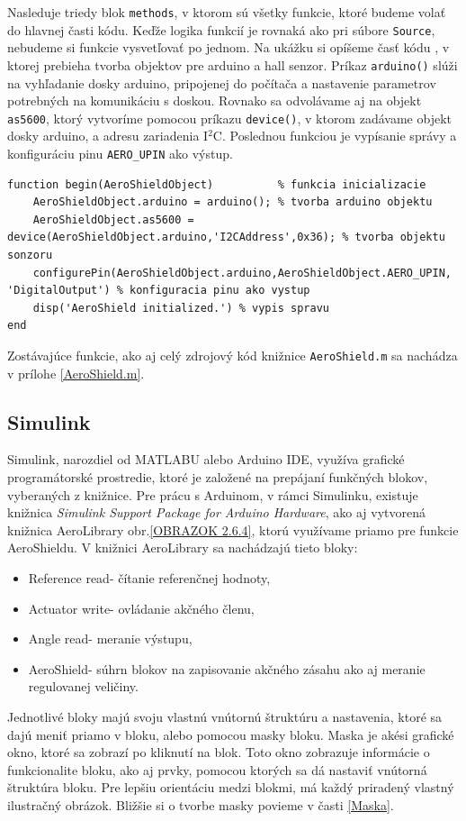 Nasleduje triedy blok \verb|methods|, v ktorom sú všetky funkcie, ktoré budeme volať do hlavnej časti kódu. Keďže logika funkcií je rovnaká ako pri súbore \verb|Source|, nebudeme si funkcie vysvetľovať po jednom. Na ukážku si opíšeme časť kódu , v ktorej prebieha tvorba objektov pre arduino a hall senzor. Príkaz \verb|arduino()| slúži na vyhľadanie dosky arduino, pripojenej do počítača a nastavenie parametrov potrebných na komunikáciu s doskou. Rovnako sa odvolávame aj na objekt \verb|as5600|, ktorý vytvoríme pomocou príkazu \verb|device()|, v ktorom zadávame objekt dosky arduino, a adresu zariadenia I$^2$C. Poslednou funkciou je vypísanie správy a konfiguráciu pinu \verb|AERO_UPIN| ako výstup. 

\begin{lstlisting}[caption={Knižnica AeroShield.m properties.},captionpos=b]
function begin(AeroShieldObject)          % funkcia inicializacie
	AeroShieldObject.arduino = arduino(); % tvorba arduino objektu
	AeroShieldObject.as5600 = device(AeroShieldObject.arduino,'I2CAddress',0x36); % tvorba objektu sonzoru
	configurePin(AeroShieldObject.arduino,AeroShieldObject.AERO_UPIN, 'DigitalOutput') % konfiguracia pinu ako vystup
	disp('AeroShield initialized.') % vypis spravu
end
\end{lstlisting}

Zostávajúce funkcie, ako aj celý zdrojový kód knižnice \verb|AeroShield.m| sa nachádza v prílohe \ref{AeroShield.m}. 

\newpage
\subsection{Simulink}
\label{SimulinkLib}

Simulink, narozdiel od MATLABU alebo Arduino IDE, využíva grafické programátorské prostredie, ktoré je založené na prepájaní funkčných blokov, vyberaných z knižnice. Pre prácu s Arduinom, v rámci Simulinku, existuje knižnica \textit{Simulink Support Package for Arduino Hardware}, ako aj vytvorená knižnica AeroLibrary obr.\ref{OBRAZOK 2.6.4}, ktorú využívame priamo pre funkcie AeroShieldu. V knižnici AeroLibrary sa nachádzajú tieto bloky: 
\begin{itemize}
	\item Reference read- čítanie referenčnej hodnoty, 
	\item Actuator write- ovládanie akčného členu, 
	\item Angle read- meranie výstupu, 
	\item AeroShield- súhrn blokov na zapisovanie akčného zásahu ako aj meranie regulovanej veličiny.
\end{itemize}
Jednotlivé bloky majú svoju vlastnú vnútornú štruktúru a nastavenia, ktoré sa dajú meniť priamo v bloku, alebo pomocou masky bloku. Maska je akési grafické okno, ktoré sa zobrazí po kliknutí na blok. Toto okno zobrazuje informácie o funkcionalite bloku, ako aj prvky, pomocou ktorých sa dá nastaviť vnútorná štruktúra bloku. Pre lepšiu orientáciu medzi blokmi, má každý priradený vlastný ilustračný obrázok. Bližšie si o tvorbe masky povieme v časti \ref{Maska}. 

